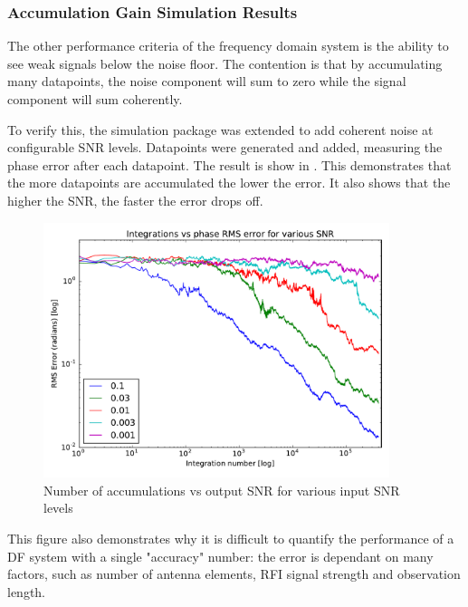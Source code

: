 \subsubsection{Accumulation Gain Simulation Results}

The other performance criteria of the frequency domain system is the ability to see weak signals below the noise floor. The contention is that by accumulating many datapoints, the noise component will sum to zero while the signal component will sum coherently.

To verify this, the simulation package was extended to add coherent noise at configurable SNR levels. Datapoints were generated and added, measuring the phase error after each datapoint. The result is show in . This demonstrates that the more datapoints are accumulated the lower the error. It also shows that the higher the SNR, the faster the error drops off.

\begin{figure}
  \centering
  \includegraphics[width=0.9\textwidth]{integration-vs-error-combined-5}
  \caption{Number of accumulations vs output SNR for various input SNR levels}
  \label{fig:system-design-integration-vs-error}
\end{figure}

This figure also demonstrates why it is difficult to quantify the performance of a DF system with a single "accuracy" number: the error is dependant on many factors, such as number of antenna elements, RFI signal strength and observation length.

